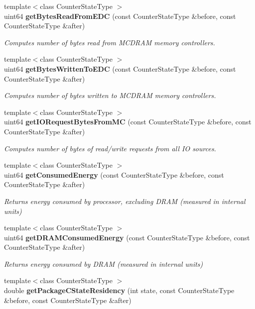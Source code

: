 \begin{DoxyCompactItemize}
{\footnotesize template$<$class Counter\+State\+Type $>$ }\\uint64 \textbf{ get\+Bytes\+Read\+From\+E\+DC} (const Counter\+State\+Type \&before, const Counter\+State\+Type \&after)
\begin{DoxyCompactList}\small\item\em Computes number of bytes read from M\+C\+D\+R\+AM memory controllers. \end{DoxyCompactList}\item 
{\footnotesize template$<$class Counter\+State\+Type $>$ }\\uint64 \textbf{ get\+Bytes\+Written\+To\+E\+DC} (const Counter\+State\+Type \&before, const Counter\+State\+Type \&after)
\begin{DoxyCompactList}\small\item\em Computes number of bytes written to M\+C\+D\+R\+AM memory controllers. \end{DoxyCompactList}\item 
{\footnotesize template$<$class Counter\+State\+Type $>$ }\\uint64 \textbf{ get\+I\+O\+Request\+Bytes\+From\+MC} (const Counter\+State\+Type \&before, const Counter\+State\+Type \&after)
\begin{DoxyCompactList}\small\item\em Computes number of bytes of read/write requests from all IO sources. \end{DoxyCompactList}\item 
{\footnotesize template$<$class Counter\+State\+Type $>$ }\\uint64 \textbf{ get\+Consumed\+Energy} (const Counter\+State\+Type \&before, const Counter\+State\+Type \&after)
\begin{DoxyCompactList}\small\item\em Returns energy consumed by processor, excluding D\+R\+AM (measured in internal units) \end{DoxyCompactList}\item 
{\footnotesize template$<$class Counter\+State\+Type $>$ }\\uint64 \textbf{ get\+D\+R\+A\+M\+Consumed\+Energy} (const Counter\+State\+Type \&before, const Counter\+State\+Type \&after)
\begin{DoxyCompactList}\small\item\em Returns energy consumed by D\+R\+AM (measured in internal units) \end{DoxyCompactList}\item 
{\footnotesize template$<$class Counter\+State\+Type $>$ }\\double \textbf{ get\+Package\+C\+State\+Residency} (int state, const Counter\+State\+Type \&before, const Counter\+State\+Type \&after)

\end{DoxyCompactItemize}
